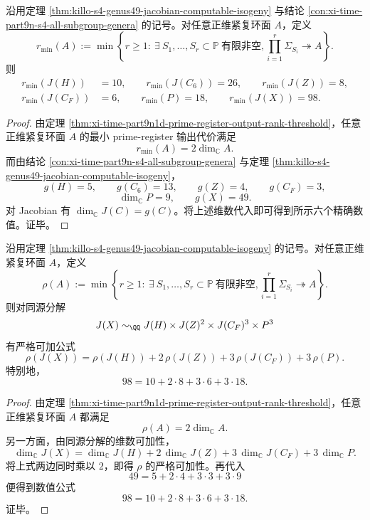 \begin{corollary}\label{cor:xi-time-part9n1d-prime-register-hurwitz-minimal-output-cost}
沿用定理 \ref{thm:killo-s4-genus49-jacobian-computable-isogeny} 与结论 \ref{con:xi-time-part9n-s4-all-subgroup-genera} 的记号。对任意正维紧复环面 \(A\)，定义
\[
r_{\min}(A):=
\min\left\{
r\ge 1:\ \exists\ S_1,\dots,S_r\subset \mathbb P\ \text{有限非空},
\prod_{i=1}^r \Sigma_{S_i}\twoheadrightarrow A
\right\}.
\]
则
\[
\boxed{\;
\begin{aligned}
r_{\min}(J(H))&=10,\qquad r_{\min}(J(C_6))=26,\qquad r_{\min}(J(Z))=8,\\
r_{\min}(J(C_F))&=6,\qquad r_{\min}(P)=18,\qquad r_{\min}(J(X))=98.
\end{aligned}
\;}
\]
\end{corollary}
\begin{proof}
由定理 \ref{thm:xi-time-part9n1d-prime-register-output-rank-threshold}，任意正维紧复环面 \(A\) 的最小 prime-register 输出代价满足
\[
r_{\min}(A)=2\dim_{\mathbb C}A.
\]
而由结论 \ref{con:xi-time-part9n-s4-all-subgroup-genera} 与定理 \ref{thm:killo-s4-genus49-jacobian-computable-isogeny}，
\[
g(H)=5,\qquad g(C_6)=13,\qquad g(Z)=4,\qquad g(C_F)=3,
\]
\[
\dim_{\mathbb C}P=9,\qquad g(X)=49.
\]
对 Jacobian 有 \(\dim_{\mathbb C}J(C)=g(C)\)。将上述维数代入即可得到所示六个精确数值。证毕。
\end{proof}

\begin{theorem}\label{thm:xi-time-part9n1d-prime-register-output-cost-additivity}
沿用定理 \ref{thm:killo-s4-genus49-jacobian-computable-isogeny} 的记号。对任意正维紧复环面 \(A\)，定义
\[
\rho(A):=
\min\left\{
r\ge 1:\ \exists\ S_1,\dots,S_r\subset \mathbb P\ \text{有限非空},
\prod_{i=1}^r \Sigma_{S_i}\twoheadrightarrow A
\right\}.
\]
则对同源分解
\[
J(X)\sim_{\QQ}J(H)\times J(Z)^2\times J(C_F)^3\times P^3
\]
有严格可加公式
\[
\boxed{\;
\rho(J(X))
=
\rho(J(H))
+2\,\rho(J(Z))
+3\,\rho(J(C_F))
+3\,\rho(P).\;}
\]
特别地，
\[
\boxed{\;
98=10+2\cdot 8+3\cdot 6+3\cdot 18.\;}
\]
\end{theorem}
\begin{proof}
由定理 \ref{thm:xi-time-part9n1d-prime-register-output-rank-threshold}，任意正维紧复环面 \(A\) 都满足
\[
\rho(A)=2\dim_{\mathbb C}A.
\]
另一方面，由同源分解的维数可加性，
\[
\dim_{\mathbb C}J(X)
=
\dim_{\mathbb C}J(H)
+2\,\dim_{\mathbb C}J(Z)
+3\,\dim_{\mathbb C}J(C_F)
+3\,\dim_{\mathbb C}P.
\]
将上式两边同时乘以 \(2\)，即得 \(\rho\) 的严格可加性。再代入
\[
49=5+2\cdot 4+3\cdot 3+3\cdot 9
\]
便得到数值公式
\[
98=10+2\cdot 8+3\cdot 6+3\cdot 18.
\]
证毕。
\end{proof}

